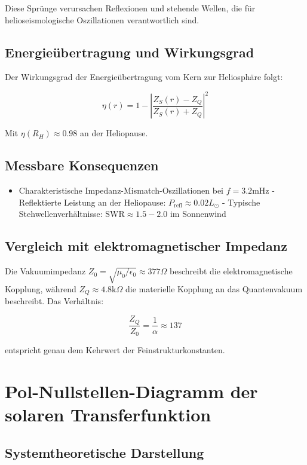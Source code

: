 Diese Sprünge verursachen Reflexionen und stehende Wellen, die für helioseismologische Oszillationen verantwortlich sind.

\subsection{Energieübertragung und Wirkungsgrad}

Der Wirkungsgrad der Energieübertragung vom Kern zur Heliosphäre folgt:

\[
\eta(r) = 1 - \left|\frac{Z_S(r) - Z_Q}{Z_S(r) + Z_Q}\right|^2
\]

Mit $\eta(R_H) \approx 0.98$ an der Heliopause.

\subsection{Messbare Konsequenzen}

\begin{itemize}
\item Charakteristische Impedanz-Mismatch-Oszillationen bei $f = 3.2  \text{mHz}$
- Reflektierte Leistung an der Heliopause: $P_{\text{refl}} \approx 0.02 L_\odot$
- Typische Stehwellenverhältnisse: $\text{SWR} \approx 1.5-2.0$ im Sonnenwind
\end{itemize}

\subsection{Vergleich mit elektromagnetischer Impedanz}

Die Vakuumimpedanz $Z_0 = \sqrt{\mu_0/\epsilon_0} \approx 377  \Omega$ beschreibt die elektromagnetische Kopplung, während $Z_Q \approx 4.8  \text{k}\Omega$ die materielle Kopplung an das Quantenvakuum beschreibt. Das Verhältnis:

\[
\frac{Z_Q}{Z_0} = \frac{1}{\alpha} \approx 137
\]

entspricht genau dem Kehrwert der Feinstrukturkonstanten.

\section{Pol-Nullstellen-Diagramm der solaren Transferfunktion}

\subsection{Systemtheoretische Darstellung}

